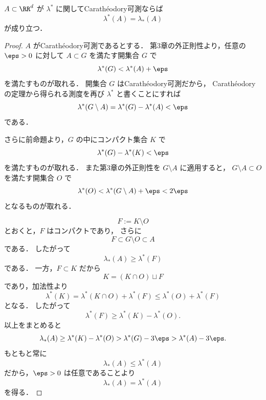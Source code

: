 \begin{theorem}[Carathéodory可測ならLebesgue可測]
$A \subset \RR^d$ が $\lambda^*$ に関してCarathéodory可測ならば
\[
\lambda^*(A)=\lambda_*(A)
\]
が成り立つ．
\end{theorem}
\begin{proof}
$A$ がCarathéodory可測であるとする．
第3章の外正則性より，任意の $\eps>0$ に対して
$A \subset G$ を満たす開集合 $G$ で
\[
\lambda^*(G)<\lambda^*(A)+\eps
\]
を満たすものが取れる．
開集合 $G$ はCarathéodory可測だから，
Carathéodoryの定理から得られる測度を再び $\lambda^*$ と書くことにすれば
\[
\lambda^*(G\setminus A)=\lambda^*(G)-\lambda^*(A)<\eps
\]
である．

さらに前命題より，$G$ の中にコンパクト集合 $K$ で
\[
\lambda^*(G)-\lambda^*(K)<\eps
\]
を満たすものが取れる．
また第3章の外正則性を $G\setminus A$ に適用すると，
$G\setminus A \subset O$ を満たす開集合 $O$ で
\[
\lambda^*(O)<\lambda^*(G\setminus A)+\eps<2\eps
\]
となるものが取れる．

\[
F:=K\setminus O
\]
とおくと，$F$ はコンパクトであり，
さらに
\[
F\subset G\setminus O\subset A
\]
である．
したがって
\[
\lambda_*(A)\ge \lambda^*(F)
\]
である．
一方，$F\subset K$ だから
\[
K=(K\cap O)\sqcup F
\]
であり，加法性より
\[
\lambda^*(K)=\lambda^*(K\cap O)+\lambda^*(F)\le \lambda^*(O)+\lambda^*(F)
\]
となる．
したがって
\[
\lambda^*(F)\ge \lambda^*(K)-\lambda^*(O).
\]
以上をまとめると
\[
\lambda_*(A)\ge \lambda^*(K)-\lambda^*(O)>\lambda^*(G)-3\eps>\lambda^*(A)-3\eps.
\]
もともと常に
\[
\lambda_*(A)\le \lambda^*(A)
\]
だから，$\eps>0$ は任意であることより
\[
\lambda_*(A)=\lambda^*(A)
\]
を得る．
\end{proof}

